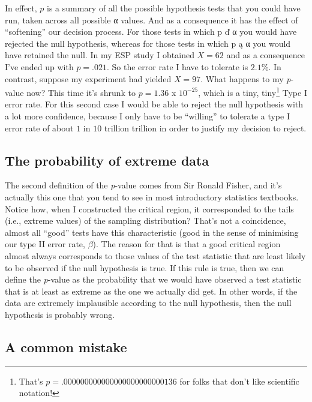 \documentclass[
  a4paper,
]{book}
\begin{document}
In effect, \(p\) is a summary of all the possible hypothesis tests that
you could have run, taken across all possible α values. And as a
consequence it has the effect of ``softening'' our decision process. For
those tests in which p ď α you would have rejected the null hypothesis,
whereas for those tests in which p ą α you would have retained the null.
In my ESP study I obtained \(X = 62\) and as a consequence I've ended up
with \(p = .021\). So the error rate I have to tolerate is \(2.1\%\). In
contrast, suppose my experiment had yielded \(X = 97\). What happens to
my \emph{p}-value now? This time it's shrunk to \(p = 1.36\) x
\(10^{-25}\), which is a tiny, tiny\footnote{That's
  \(p = .000000000000000000000000136\) for folks that don't like
  scientific notation!} Type I error rate. For this second case I would
be able to reject the null hypothesis with a lot more confidence,
because I only have to be ``willing'' to tolerate a type I error rate of
about \(1\) in \(10\) trillion trillion in order to justify my decision
to reject.

\hypertarget{the-probability-of-extreme-data}{%
\subsection{The probability of extreme
data}\label{the-probability-of-extreme-data}}

The second definition of the \emph{p}-value comes from Sir Ronald
Fisher, and it's actually this one that you tend to see in most
introductory statistics textbooks. Notice how, when I constructed the
critical region, it corresponded to the tails (i.e., extreme values) of
the sampling distribution? That's not a coincidence, almost all ``good''
tests have this characteristic (good in the sense of minimising our type
II error rate, \(\beta\)). The reason for that is that a good critical
region almost always corresponds to those values of the test statistic
that are least likely to be observed if the null hypothesis is true. If
this rule is true, then we can define the \emph{p}-value as the
probability that we would have observed a test statistic that is at
least as extreme as the one we actually did get. In other words, if the
data are extremely implausible according to the null hypothesis, then
the null hypothesis is probably wrong.

\hypertarget{a-common-mistake}{%
\subsection{A common mistake}\label{a-common-mistake}}
\end{document}
